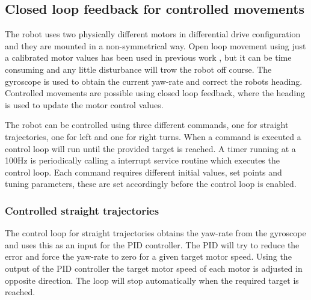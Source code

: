 
 


\subsection{Closed loop feedback for controlled movements}


The robot uses two physically different motors in differential drive configuration and they are mounted in a non-symmetrical way.
Open loop movement using just a calibrated motor values has been used in previous work \cite{legoc_uist_2016}, but it can be time consuming and any little disturbance will trow the robot off course.
The gyroscope is used to obtain the current yaw-rate and correct the robots heading.
Controlled movements are possible using closed loop feedback, where the heading is used to update the motor control values.

The robot can be controlled using three different commands, one for straight trajectories, one for left and one for right turns.
When a command is executed a control loop will run until the provided target is reached.
A timer running at a 100Hz is periodically calling a interrupt service routine which executes the control loop.   
Each command requires different initial values, set points and tuning parameters, these are set accordingly before the control loop is enabled.

\subsubsection{Controlled straight trajectories}

The control loop for straight trajectories obtains the yaw-rate from the gyroscope and uses this as an input for the PID controller.
The PID will try to reduce the error and force the yaw-rate to zero for a given target motor speed.
Using the output of the PID controller the target motor speed of each motor is adjusted in opposite direction.
The loop will stop automatically when the required target is reached.

